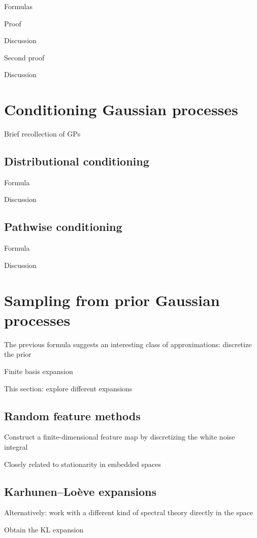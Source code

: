 \documentclass[11pt]{book}
\begin{document}
Formulas

Proof

Discussion

Second proof

Discussion

\section{Conditioning Gaussian processes}

Brief recollection of GPs 

\subsection{Distributional conditioning}

Formula

Discussion

\subsection{Pathwise conditioning}

Formula

Discussion

\section{Sampling from prior Gaussian processes}

The previous formula suggests an interesting class of approximations: discretize the prior

Finite basis expansion

This section: explore different expansions

\subsection{Random feature methods}

Construct a finite-dimensional feature map by discretizing the white noise integral

Closely related to stationarity in embedded spaces

\subsection{Karhunen--Loève expansions}

Alternatively: work with a different kind of spectral theory directly in the space

Obtain the KL expansion
\end{document}

